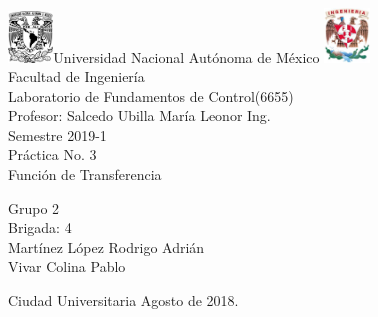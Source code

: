 

\begin{titlepage}
     \begin{center}
	\includegraphics[width=0.09\textwidth]{UNAM}\Large Universidad Nacional Autónoma de México
        	\includegraphics[width=0.09\textwidth]{FI}\\[1cm]
        \Large Facultad de Ingeniería\\[1cm]
         \Large Laboratorio de Fundamentos de Control(6655)\\[1cm]
         \footnotesize Profesor: Salcedo Ubilla María Leonor Ing.\\[1cm]
        \footnotesize Semestre 2019-1\\[1cm]
        
       

        \Large Práctica No. 3\\[1cm]
        
           

\Large Función de Transferencia
        
          \begin{flushright}
\footnotesize  Grupo 2\\[0.5cm]
\footnotesize Brigada: 4\\[0.5cm]
\footnotesize Martínez López Rodrigo Adrián\\[0.5cm]
\footnotesize Vivar Colina Pablo\\[0.5cm]
 \end{flushright}
          \begin{flushleft}
        \footnotesize Ciudad Universitaria Agosto de 2018.\\
          \end{flushleft}
         
          
   \end{center}
\end{titlepage}
